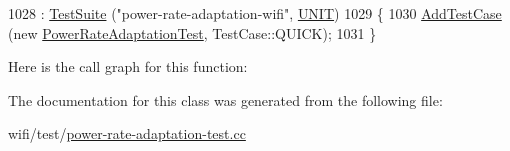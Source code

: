 \begin{DoxyCode}
1028   : \hyperlink{classns3_1_1TestSuite_a904b0c40583b744d30908aeb94636d1a}{TestSuite} (\textcolor{stringliteral}{"power-rate-adaptation-wifi"}, \hyperlink{classns3_1_1TestSuite_a1ebfcab34ec8161e085e8e3a1855eae0a3885375a3787abf60431f8454b3cadbd}{UNIT})
1029 \{
1030   \hyperlink{classns3_1_1TestCase_a3718088e3eefd5d6454569d2e0ddd835}{AddTestCase} (\textcolor{keyword}{new} \hyperlink{classPowerRateAdaptationTest}{PowerRateAdaptationTest}, TestCase::QUICK);
1031 \}
\end{DoxyCode}


Here is the call graph for this function\+:




The documentation for this class was generated from the following file\+:\begin{DoxyCompactItemize}
\item 
wifi/test/\hyperlink{power-rate-adaptation-test_8cc}{power-\/rate-\/adaptation-\/test.\+cc}\end{DoxyCompactItemize}
